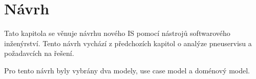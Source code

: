 \chapter{Návrh}
Tato kapitola se věnuje návrhu nového IS pomocí nástrojů softwarového inženýrství. Tento návrh vychází z předchozích kapitol o analýze pneuservisu a požadavcích na řešení. 

Pro tento návrh byly vybrány dva modely, use case model a doménový model.

